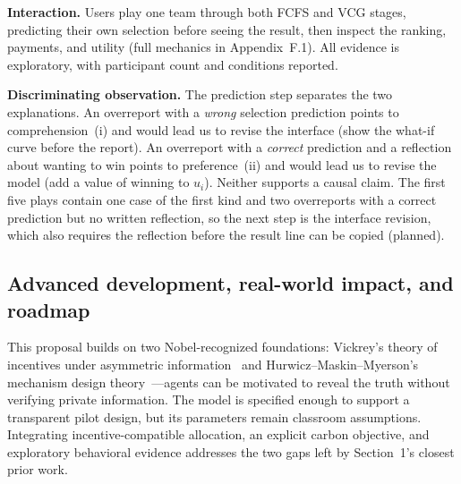 \vspace{3pt}

\noindent
\textbf{Interaction.} Users play one team through both FCFS and VCG stages, predicting their own selection before seeing the result, then inspect the ranking, payments, and utility (full mechanics in Appendix~F.1). All evidence is exploratory, with participant count and conditions reported.

\vspace{3pt}

\noindent
\textbf{Discriminating observation.} The prediction step separates the two explanations. An overreport with a \emph{wrong} selection prediction points to comprehension~(i) and would lead us to revise the interface (show the what-if curve before the report). An overreport with a \emph{correct} prediction and a reflection about wanting to win points to preference~(ii) and would lead us to revise the model (add a value of winning to $u_i$). Neither supports a causal claim. The first five plays contain one case of the first kind and two overreports with a correct prediction but no written reflection, so the next step is the interface revision, which also requires the reflection before the result line can be copied (planned).

\subsection{Advanced development, real-world impact, and roadmap}

\noindent
This proposal builds on two Nobel-recognized foundations: Vickrey's theory of incentives under asymmetric information~\cite{vickrey1961,nobel1996} and Hurwicz--Maskin--Myerson's mechanism design theory~\cite{nobel2007}---agents can be motivated to reveal the truth without verifying private information. The model is specified enough to support a transparent pilot design, but its parameters remain classroom assumptions. Integrating incentive-compatible allocation, an explicit carbon objective, and exploratory behavioral evidence addresses the two gaps left by Section~1's closest prior work.

\vspace{3pt}

